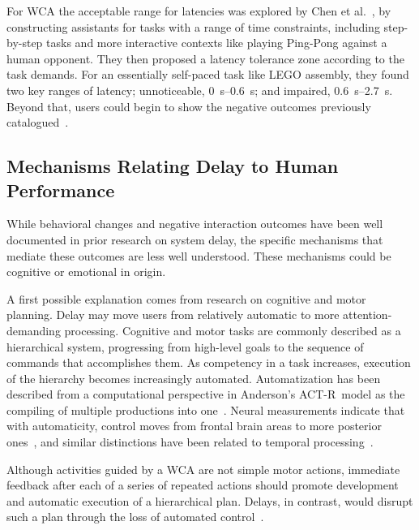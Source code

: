 \documentclass[10pt,letterpaper]{article}
\providecommand{\DIFaddtex}[1]{#1} %
\providecommand{\DIFdeltex}[1]{} %
\providecommand{\DIFaddbegin}{\protect\color{blue}} %
\providecommand{\DIFaddend}{\protect\color{black}} %
\providecommand{\DIFdelbegin}{\protect\color{red}} %
\providecommand{\DIFdelend}{\protect\color{black}} %
\providecommand{\DIFadd}[1]{\texorpdfstring{\DIFaddtex{#1}}{#1}} %
\providecommand{\DIFdel}[1]{\texorpdfstring{\DIFdeltex{#1}}{}} %
\newcommand{\DIFscaledelfig}{0.5}
\newlength{\DIFdelgraphicswidth} %
\newlength{\DIFdelgraphicsheight} %
\newcommand{\DIFaddincludegraphics}[2][]{{\color{blue}\fbox{\DIFOincludegraphics[#1]{#2}}}} %
\newcommand{\DIFdelincludegraphics}[2][]{%
\sbox{\DIFdelgraphicsbox}{\DIFOincludegraphics[#1]{#2}}%
\settoboxwidth{\DIFdelgraphicswidth}{\DIFdelgraphicsbox} %
\settoboxtotalheight{\DIFdelgraphicsheight}{\DIFdelgraphicsbox} %
\scalebox{\DIFscaledelfig}{%
\parbox[b]{\DIFdelgraphicswidth}{\usebox{\DIFdelgraphicsbox}\\[-\baselineskip] \rule{\DIFdelgraphicswidth}{0em}}\llap{\resizebox{\DIFdelgraphicswidth}{\DIFdelgraphicsheight}{%
\setlength{\unitlength}{\DIFdelgraphicswidth}%
\begin{picture}(1,1)%
\thicklines\linethickness{2pt} %
{\color[rgb]{1,0,0}\put(0,0){\framebox(1,1){}}}%
{\color[rgb]{1,0,0}\put(0,0){\line( 1,1){1}}}%
{\color[rgb]{1,0,0}\put(0,1){\line(1,-1){1}}}%
\end{picture}%
}\hspace*{3pt}}} %
} %
\DeclareRobustCommand{\DIFaddbegin}{\DIFOaddbegin \let\includegraphics\DIFaddincludegraphics} %
\DeclareRobustCommand{\DIFaddend}{\DIFOaddend \let\includegraphics\DIFOincludegraphics} %
\DeclareRobustCommand{\DIFdelbegin}{\DIFOdelbegin \let\includegraphics\DIFdelincludegraphics} %
\DeclareRobustCommand{\DIFdelend}{\DIFOaddend \let\includegraphics\DIFOincludegraphics} %
\begin{document}
For WCA the acceptable range for latencies was explored by Chen et al.~\cite{Chen:AnEmpiricalStudyOfLatency}, by constructing assistants for tasks with a range of time constraints, including step-by-step tasks and more interactive contexts like playing Ping-Pong against a human opponent.
They then proposed a latency tolerance zone according to the task demands.
For an essentially self-paced task like LEGO assembly, they found two key ranges of latency; unnoticeable, \SIrange{0}{0.6}{\second}; and impaired, \SIrange{0.6}{2.7}{\second}. 
Beyond that, users could begin to show the negative outcomes previously catalogued~\cite{dabrowsky:2011:40years}.


\subsection{\DIFdelbegin \DIFdel{Potential }\DIFdelend Mechanisms Relating Delay to Human Performance}\label{ssec:potentialmechs}

While behavioral changes and negative interaction outcomes have been well documented in prior research on system delay, the specific mechanisms that mediate these outcomes are less well understood. 
These mechanisms could be cognitive or emotional in origin.

\DIFdelbegin \DIFdel{Research }\DIFdelend \DIFaddbegin \DIFadd{A first possible explanation comes from research }\DIFaddend on cognitive and motor planning\DIFdelbegin \DIFdel{suggests that delay }\DIFdelend \DIFaddbegin \DIFadd{. 
Delay }\DIFaddend may move users from relatively automatic to more attention-demanding processing.
Cognitive and motor tasks are commonly described as a hierarchical system, progressing from high-level goals to the sequence of commands that accomplishes them.
As competency in a task increases, execution of the hierarchy becomes increasingly automated.
Automatization has been described from a computational perspective in {Anderson's ACT-R}~model as the compiling of multiple productions into one~\cite{neves1981knowledge}.
Neural measurements indicate that with automaticity, control moves from frontal brain areas to more posterior ones~\cite{jeon2015degree,puttemans2005changes}, and similar distinctions have been related to temporal processing~\cite{lewis2003distinct,koch2009neural,lee2019limiting}.

Although activities guided by a WCA are not simple motor actions, immediate feedback after each of a series of repeated actions should promote development and automatic execution of a hierarchical plan.
Delays, in contrast, would disrupt such a plan through the loss of automated control~\cite{lee2019limiting}.
\end{document}
